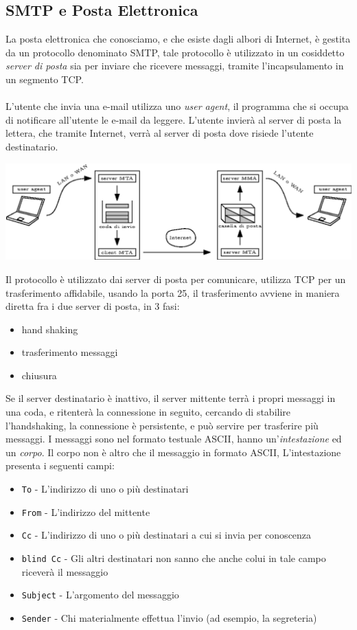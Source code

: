 \documentclass[12pt, letterpaper]{article}
\newcommand{\code}[1]{\colorbox{light-gray}{\texttt{#1}}}
\newcommand{\acc}{\\\hphantom{}\\}
\begin{document}
\subsection{SMTP e Posta Elettronica}
La posta elettronica che conosciamo, e che esiste dagli albori di
Internet, è gestita da un protocollo denominato SMTP, tale protocollo è utilizzato in un
cosiddetto \textit{server di posta} sia per inviare che ricevere messaggi, tramite
l'incapsulamento in un segmento TCP.\acc
L'utente che invia una e-mail utilizza uno \textit{user agent}, il programma che si occupa di notificare
all'utente le e-mail da leggere. L'utente invierà al server di posta la lettera, che tramite
Internet, verrà al server di posta dove risiede l'utente destinatario.\begin{center}
    \includegraphics[width=1\textwidth ]{images/smtp.eps}
\end{center}
Il protocollo è utilizzato dai server di posta per comunicare, utilizza TCP per un trasferimento
affidabile, usando la porta 25, il trasferimento avviene in maniera diretta fra i due server di posta, in
3 fasi:\begin{itemize}
    \item hand shaking
    \item trasferimento messaggi
    \item chiusura
\end{itemize}
Se il server destinatario è inattivo, il server mittente terrà i propri messaggi in una coda, e ritenterà
la connessione in seguito, cercando di stabilire l'handshaking, la connessione è persistente, e può servire
per trasferire più messaggi. I messaggi sono nel formato testuale ASCII, hanno un'\textit{intestazione}
ed un \textit{corpo}. Il corpo non è altro che il messaggio in formato
ASCII, L'intestazione presenta i seguenti campi:\begin{itemize}
    \item \code{To} - L'indirizzo di uno o più destinatari
    \item \code{From} - L'indirizzo del mittente
    \item \code{Cc} - L'indirizzo di uno o più destinatari a cui si invia per conoscenza
    \item \code{blind Cc} - Gli altri destinatari non sanno che anche colui in tale campo riceverà il messaggio
    \item \code{Subject} - L'argomento del messaggio
    \item \code{Sender} - Chi materialmente effettua l'invio (ad esempio, la segreteria)
\end{itemize}
\end{document}
